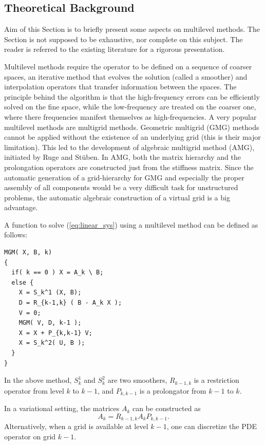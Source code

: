 
\subsection{Theoretical Background}
\label{ml:theoretical}

Aim of this Section is to briefly present some aspects on multilevel
methods. The Section is not supposed to be exhaustive, nor complete on
this subject. The reader is referred to the existing literature for a
rigorous presentation.

\medskip

Multilevel methods require the operator to be defined on a sequence of
coarser spaces, an iterative method that evolves the solution (called a
smoother) and interpolation operators that transfer information between
the spaces. The principle behind the algorithm is that the
high-frequency errors can be efficiently solved on the fine space, while
the low-frequency are treated on the coarser one, where there
frequencies manifest themselves as high-frequencies. A very popular
multilevel methods are multigrid methods.  Geometric multigrid (GMG)
methods cannot be applied without the existence of an underlying grid
(this is their major limitation). This led to the development of
algebraic multigrid method (AMG), initiated by Ruge and St\"uben.  In
AMG, both the matrix hierarchy and the prolongation operators are
constructed just from the stiffness matrix.  Since the automatic
generation of a grid-hierarchy for GMG and especially the proper
assembly of all components would be a very difficult task for
unstructured problems, the automatic algebraic construction of a virtual
grid is a big advantage.

A function to solve (\ref{eq:linear_sys}) using a multilevel method can
be defined as follows:
\begin{verbatim}
MGM( X, B, k)
{
  if( k == 0 ) X = A_k \ B;
  else {
    X = S_k^1 (X, B);
    D = R_{k-1,k} ( B - A_k X );
    V = 0;
    MGM( V, D, k-1 );
    X = X + P_{k,k-1} V;
    X = S_k^2( U, B );
  }
}
\end{verbatim}
In the above method, $S_k^1$ and $S_k^2$ are two smoothers, $R_{k-1,k}$
is a restriction operator from level $k$ to $k-1$, and $P_{k,k-1}$ is a
prolongator from $k-1$ to $k$.

In a variational setting, the matrices $A_k$ can be constructed as
\[
A_k = R_{k-1,k} A_k P_{k,k-1}.
\]
Alternatively, when a grid is available at level $k-1$, one can
discretize the PDE operator on grid $k-1$.

